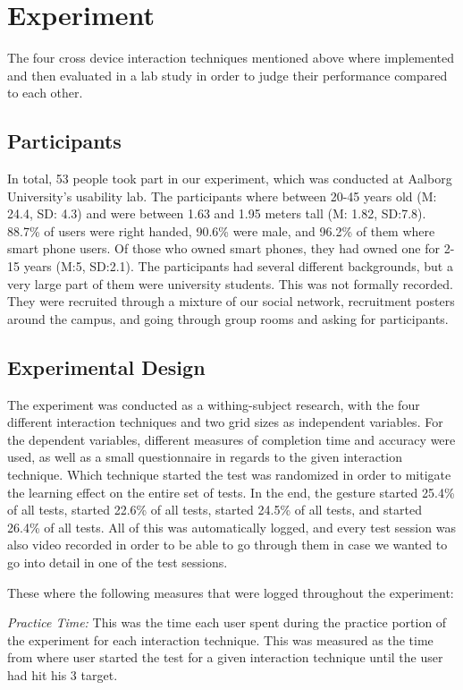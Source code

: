 \section{Experiment} \label{sec:experiment}
The four cross device interaction techniques mentioned above where implemented and then evaluated in a lab study in order to judge their performance compared to each other.

\subsection{Participants}
In total, 53 people took part in our experiment, which was conducted at Aalborg University's usability lab. The participants where between 20-45 years old (M: 24.4, SD: 4.3) and were between 1.63 and 1.95 meters tall (M: 1.82, SD:7.8). 88.7\% of users were right handed, 90.6\% were male, and 96.2\% of them where smart phone users. Of those who owned smart phones, they had owned one for 2-15 years (M:5, SD:2.1). The participants had several different backgrounds, but a very large part of them were university students. This was not formally recorded. They were recruited through a mixture of our social network, recruitment posters around the campus, and going through group rooms and asking for participants. 

\subsection{Experimental Design}\label{subsec:expdesign}
The experiment was conducted as a withing-subject research, with the four different interaction techniques and two grid sizes as independent variables. For the dependent variables, different measures of completion time and accuracy were used, as well as a small questionnaire in regards to the given interaction technique. Which technique started the test was randomized in order to mitigate the learning effect on the entire set of tests. In the end, the \pinch gesture started 25.4\% of all tests, \swipe started 22.6\% of all tests, \throw started 24.5\% of all tests, and \tilt started 26.4\% of all tests. All of this was automatically logged, and every test session was also video recorded in order to be able to go through them in case we wanted to go into detail in one of the test sessions.

These where the following measures that were logged throughout the experiment: 

\textit{Practice Time:} This was the time each user spent during the practice portion of the experiment for each interaction technique. This was measured as the time from where user started the test for a given interaction technique until the user had hit his 3 target. 


